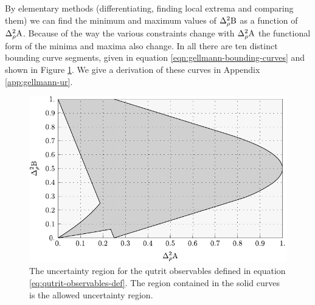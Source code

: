 By elementary methods (differentiating, finding local extrema and comparing them) we can find the minimum and maximum values of $\varr{\opb}$ as a function of $\varr{\opa}$. Because of the way the various constraints change with $\varr{\opa}$ the functional form of the minima and maxima also change. In all there are ten distinct bounding curve segments, given in equation \eqref{eqn:gellmann-bounding-curves} and shown in Figure \ref{fig:qutrit-uncertainty-region}. We give a derivation of these curves in Appendix \ref{app:gellmann-ur}.
\begin{center}
  \begin{figure}[ht]
    \includegraphics[width=.8\textwidth]{figs/full-gellmann-ur}
    \caption[The uncertainty region for the qutrit observables defined in equation \eqref{eq:qutrit-observables-def}]{The uncertainty region for the qutrit observables defined in equation \eqref{eq:qutrit-observables-def}. The region contained in the solid curves is the allowed uncertainty region.}
    \label{fig:qutrit-uncertainty-region}
  \end{figure}
\end{center}

